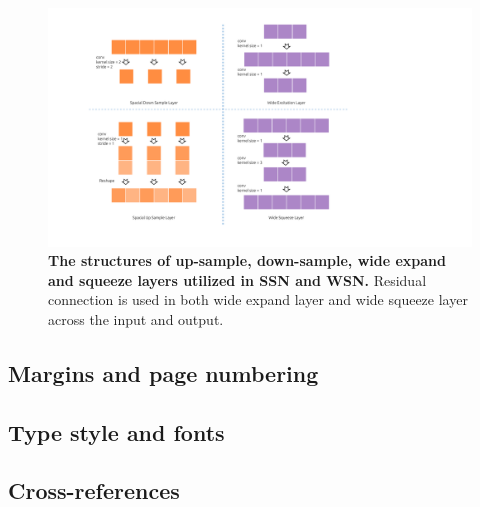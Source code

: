 \documentclass[10pt,twocolumn,letterpaper]{article}
\begin{document}
\begin{figure}[t]
  \centering
   \includegraphics[width=1\linewidth]{./figs/net2.pdf}
   \caption{\textbf{The structures of up-sample, down-sample, wide expand and squeeze layers utilized in SSN and WSN. }
   Residual connection is used in both wide expand layer and wide squeeze layer across the input and output. 
   }
   \label{fig:net2}
\end{figure}


\subsection{Margins and page numbering}


\subsection{Type style and fonts}



\subsection{Cross-references}
\end{document}
